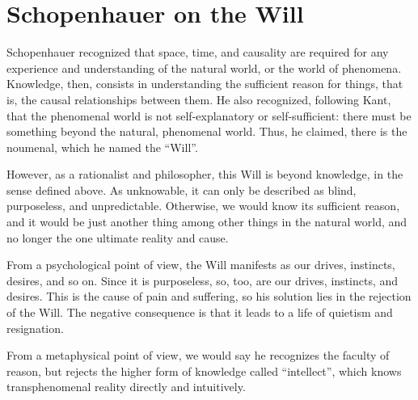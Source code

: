 \section{Schopenhauer on the Will}

Schopenhauer recognized that space, time, and causality are required for any experience and understanding of the natural world, or the world of phenomena. Knowledge, then, consists in understanding the sufficient reason for things, that is, the causal relationships between them. He also recognized, following Kant, that the phenomenal world is not self-explanatory or self-sufficient: there must be something beyond the natural, phenomenal world. Thus, he claimed, there is the noumenal, which he named the ``Will''.

However, as a rationalist and philosopher, this Will is beyond knowledge, in the sense defined above. As unknowable, it can only be described as blind, purposeless, and unpredictable. Otherwise, we would know its sufficient reason, and it would be just another thing among other things in the natural world, and no longer the one ultimate reality and cause.

From a psychological point of view, the Will manifests as our drives, instincts, desires, and so on. Since it is purposeless, so, too, are our drives, instincts, and desires. This is the cause of pain and suffering, so his solution lies in the rejection of the Will. The negative consequence is that it leads to a life of quietism and resignation.

From a metaphysical point of view, we would say he recognizes the faculty of reason, but rejects the higher form of knowledge called ``intellect'', which knows transphenomenal reality directly and intuitively.



